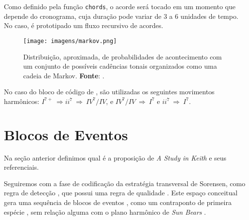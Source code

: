 Como definido pela função \verb|chords|, o acorde será tocado em um momento que depende do cronograma, cuja duração pode variar de 3 a 6 unidades de tempo. No caso, é prototipado um fluxo recursivo de acordes.

\begin{figure}
  \centering
  \texttt{[image: imagens/markov.png]}
  \caption{Distribuição, aproximada, de probabilidades de acontecimento com um conjunto de possíveis cadências tonais organizados como uma cadeia de Markov. \textbf{Fonte}: .}
   \label{fig:markov}
\end{figure}

No caso do bloco de código de , são utilizadas os seguintes movimentos harmônicos: $I^{7+}~\Rightarrow ii^{7}~\Rightarrow~IV^{7}/IV$, e $IV^{7}/IV~\Rightarrow~I^{7}$ e $ii^{7}~\Rightarrow~I^{7}$.



\section{Blocos de Eventos}\label{sec:eventos}

Na seção anterior definimos qual é a proposição de \emph{A Study in Keith} e seus referenciais.

Seguiremos com a fase de codificação da estratégia transversal  de Sorensen, como regra de detecção , que possui uma regra de qualidade  . Este espaço conceitual gera uma sequência de blocos de eventos  , como um contraponto de primeira espécie , sem relação alguma com o plano harmônico de \emph{Sun Bears} .

